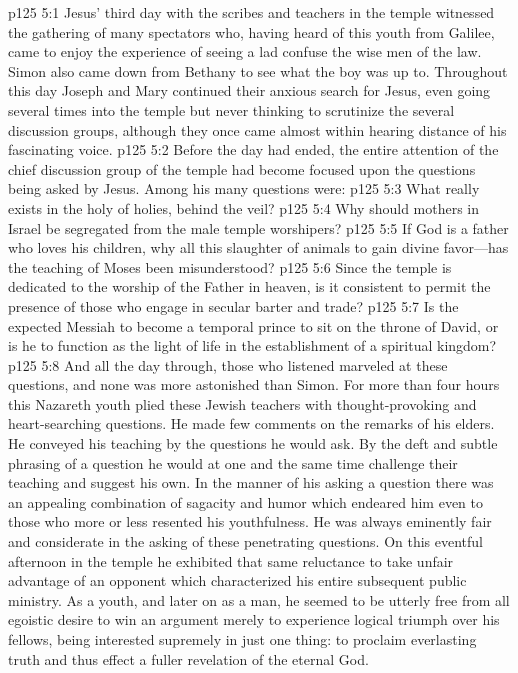 \vs p125 5:1 Jesus’ third day with the scribes and teachers in the temple witnessed the gathering of many spectators who, having heard of this youth from Galilee, came to enjoy the experience of seeing a lad confuse the wise men of the law. Simon also came down from Bethany to see what the boy was up to. Throughout this day Joseph and Mary continued their anxious search for Jesus, even going several times into the temple but never thinking to scrutinize the several discussion groups, although they once came almost within hearing distance of his fascinating voice.
\vs p125 5:2 Before the day had ended, the entire attention of the chief discussion group of the temple had become focused upon the questions being asked by Jesus. Among his many questions were:
\pc \vs p125 5:3 \bibnobreakspace \textcolor{ubdarkred}{What really exists in the holy of holies, behind the veil?}
\pc \vs p125 5:4 \bibnobreakspace \textcolor{ubdarkred}{Why should mothers in Israel be segregated from the male temple worshipers?}
\pc \vs p125 5:5 \bibnobreakspace \textcolor{ubdarkred}{If God is a father who loves his children, why all this slaughter of animals to gain divine favor---has the teaching of Moses been misunderstood?}
\pc \vs p125 5:6 \bibnobreakspace \textcolor{ubdarkred}{Since the temple is dedicated to the worship of the Father in heaven, is it consistent to permit the presence of those who engage in secular barter and trade?}
\pc \vs p125 5:7 \bibnobreakspace \textcolor{ubdarkred}{Is the expected Messiah to become a temporal prince to sit on the throne of David, or is he to function as the light of life in the establishment of a spiritual kingdom?}
\pc \vs p125 5:8 And all the day through, those who listened marveled at these questions, and none was more astonished than Simon. For more than four hours this Nazareth youth plied these Jewish teachers with thought\hyp{}provoking and heart\hyp{}searching questions. He made few comments on the remarks of his elders. He conveyed his teaching by the questions he would ask. By the deft and subtle phrasing of a question he would at one and the same time challenge their teaching and suggest his own. In the manner of his asking a question there was an appealing combination of sagacity and humor which endeared him even to those who more or less resented his youthfulness. He was always eminently fair and considerate in the asking of these penetrating questions. On this eventful afternoon in the temple he exhibited that same reluctance to take unfair advantage of an opponent which characterized his entire subsequent public ministry. As a youth, and later on as a man, he seemed to be utterly free from all egoistic desire to win an argument merely to experience logical triumph over his fellows, being interested supremely in just one thing: to proclaim everlasting truth and thus effect a fuller revelation of the eternal God.\plusone
